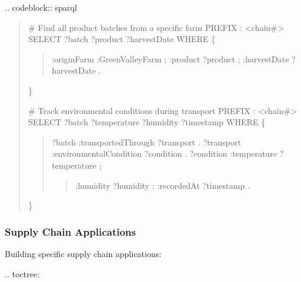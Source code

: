 \documentclass[letterpaper,10pt,english]{sphinxmanual}
\begin{document}
\sphinxAtStartPar
{}
.. code\sphinxhyphen{}block:: sparql
\begin{quote}

\sphinxAtStartPar
\# Find all product batches from a specific farm
PREFIX : \textless{}\sphinxhyphen{}chain\#\textgreater{}
SELECT ?batch ?product ?harvestDate WHERE \{
\begin{quote}
\begin{description}
\sphinxAtStartPar
:originFarm :GreenValleyFarm ;
:product ?product ;
:harvestDate ?harvestDate .

\end{description}
\end{quote}

\sphinxAtStartPar
\}

\sphinxAtStartPar
\# Track environmental conditions during transport
PREFIX : \textless{}\sphinxhyphen{}chain\#\textgreater{}
SELECT ?batch ?temperature ?humidity ?timestamp WHERE \{
\begin{quote}

\sphinxAtStartPar
?batch :transportedThrough ?transport .
?transport :environmentalCondition ?condition .
?condition :temperature ?temperature ;
\begin{quote}

\sphinxAtStartPar
:humidity ?humidity ;
:recordedAt ?timestamp .
\end{quote}
\end{quote}

\sphinxAtStartPar
\}
\end{quote}


\subsubsection{Supply Chain Applications}
\label{\detokenize{user-guide/index:supply-chain-applications}}
\sphinxAtStartPar
Building specific supply chain applications:

\sphinxAtStartPar
{}
.. toctree:

\begin{sphinxVerbatim}[commandchars=\\\{\}]
 
   

\end{sphinxVerbatim}
\end{document}
